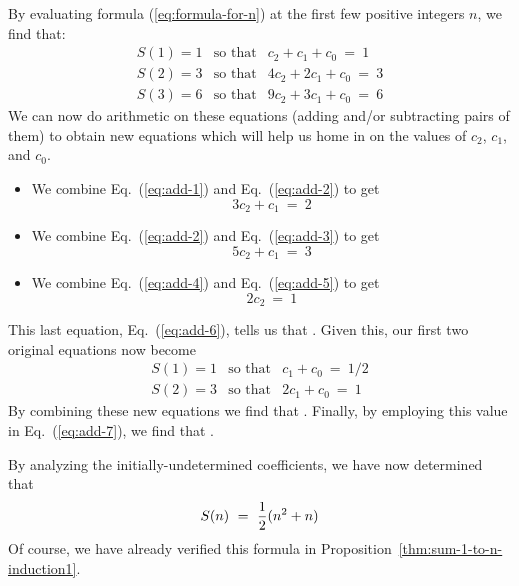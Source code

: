 \smallskip

\noindent By evaluating formula (\ref{eq:formula-for-n}) at the first few positive integers $n$, we find that:
\begin{eqnarray}
\label{eq:add-1}
S(1) = 1
 & \mbox{so that} &
 c_2 + c_1 + c_0 \ = \ 1 \\
\label{eq:add-2}
S(2) = 3
 & \mbox{so that} &
 4 c_2 + 2 c_1 + c_0 \ = \ 3 \\
\label{eq:add-3}
S(3) = 6
 & \mbox{so that} &
 9 c_2 + 3 c_1 + c_0 \ = \ 6
\end{eqnarray}
We can now do arithmetic on these equations (adding and/or subtracting pairs of them) to obtain new equations which will help us home in on the values of $c_2$, $c_1$, and $c_0$.
\begin{itemize}
\item
We combine Eq.~(\ref{eq:add-1}) and Eq.~(\ref{eq:add-2}) to get
\begin{equation}
\label{eq:add-4}
3c_2 + c_1 \ = \ 2
\end{equation}

\medskip\item
We combine Eq.~(\ref{eq:add-2}) and Eq.~(\ref{eq:add-3}) to get
\begin{equation}
\label{eq:add-5}
5 c_2 + c_1 \ = \ 3
\end{equation}

\medskip\item
We combine Eq.~(\ref{eq:add-4}) and Eq.~(\ref{eq:add-5}) to get
\begin{equation}
\label{eq:add-6}
2 c_2 \ = \ 1
\end{equation}
\end{itemize}
This last equation, Eq.~(\ref{eq:add-6}), tells us that .  Given this, our first two original equations now become
\begin{eqnarray}
\label{eq:add-7}
S(1) = 1
 & \mbox{so that} &
c_1 + c_0 \ = \ 1/2 \\
\label{eq:add-8}
S(2) = 3
 & \mbox{so that} &
2 c_1 + c_0 \ = \ 1
\end{eqnarray}
By combining these new equations we find that .  Finally, by employing this value in Eq.~(\ref{eq:add-7}), we find that .

\medskip

\noindent
By analyzing the initially-undetermined coefficients, we have now determined that
\[ S(n) \ = \ {1 \over 2}(n^2 + n) \]
Of course, we have already verified this formula in Proposition~\ref{thm:sum-1-to-n-induction1}.

